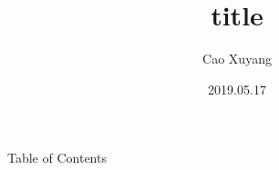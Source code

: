 \documentclass{beamer}
\title{title}
\author{Cao Xuyang}
\date{2019.05.17}
\begin{document}
\frame{\titlepage}                  %
\begin{frame}{Table of Contents}    %
    \setcounter{tocdepth}{1}        %
    \tableofcontents                %
\end{frame}





\end{document}

